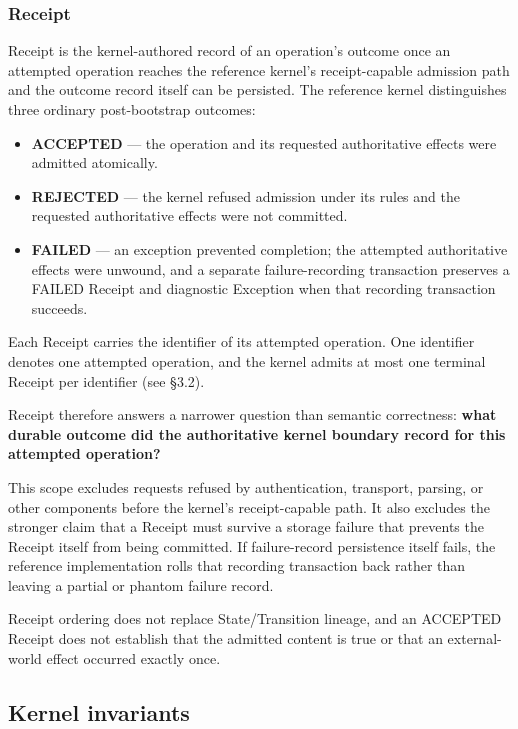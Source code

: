 \documentclass[11pt]{article}
\begin{document}
\subsubsection{Receipt}

Receipt is the kernel-authored record of an operation's outcome once an attempted operation reaches the reference kernel's receipt-capable admission path and the outcome record itself can be persisted. The reference kernel distinguishes three ordinary post-bootstrap outcomes:

\begin{itemize}
\item \textbf{ACCEPTED} --- the operation and its requested authoritative effects were admitted atomically.
\item \textbf{REJECTED} --- the kernel refused admission under its rules and the requested authoritative effects were not committed.
\item \textbf{FAILED} --- an exception prevented completion; the attempted authoritative effects were unwound, and a separate failure-recording transaction preserves a FAILED Receipt and diagnostic Exception when that recording transaction succeeds.
\end{itemize}

Each Receipt carries the identifier of its attempted operation. One identifier denotes one attempted operation, and the kernel admits at most one terminal Receipt per identifier (see §3.2).

Receipt therefore answers a narrower question than semantic correctness: \textbf{what durable outcome did the authoritative kernel boundary record for this attempted operation?}

This scope excludes requests refused by authentication, transport, parsing, or other components before the kernel's receipt-capable path. It also excludes the stronger claim that a Receipt must survive a storage failure that prevents the Receipt itself from being committed. If failure-record persistence itself fails, the reference implementation rolls that recording transaction back rather than leaving a partial or phantom failure record.

Receipt ordering does not replace State/Transition lineage, and an ACCEPTED Receipt does not establish that the admitted content is true or that an external-world effect occurred exactly once.

\subsection{Kernel invariants}
\end{document}
